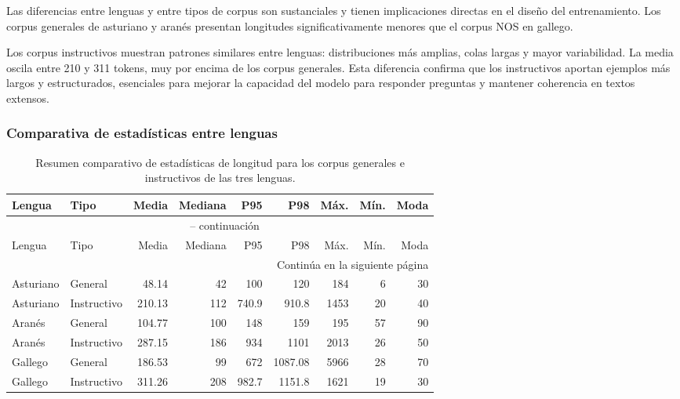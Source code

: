 Las diferencias entre lenguas y entre tipos de corpus son sustanciales y tienen implicaciones directas en el diseño del entrenamiento. Los corpus generales de asturiano y aranés presentan longitudes significativamente menores que el corpus NOS en gallego. 

Los corpus instructivos muestran patrones similares entre lenguas: distribuciones más amplias, colas largas y mayor variabilidad. La media oscila entre 210 y 311 tokens, muy por encima de los corpus generales. Esta diferencia confirma que los instructivos aportan ejemplos más largos y estructurados, esenciales para mejorar la capacidad del modelo para responder preguntas y mantener coherencia en textos extensos.

\subsubsection*{Comparativa de estadísticas entre lenguas}

\begin{longtable}{@{}llrrrrrrr@{}}
\caption{Resumen comparativo de estadísticas de longitud para los corpus generales e instructivos de las tres lenguas.}
\label{tab:estadisticas_globales} \\
\toprule
Lengua & Tipo & Media & Mediana & P95 & P98 & Máx. & Mín. & Moda \\ 
\midrule
\endfirsthead

\multicolumn{9}{c}{\tablename\ \thetable{} -- continuación} \\
\toprule
Lengua & Tipo & Media & Mediana & P95 & P98 & Máx. & Mín. & Moda \\ 
\midrule
\endhead

\midrule \multicolumn{9}{r}{Continúa en la siguiente página} \\
\endfoot

\bottomrule
\endlastfoot

Asturiano & General & 48.14 & 42 & 100 & 120 & 184 & 6 & 30 \\
Asturiano & Instructivo & 210.13 & 112 & 740.9 & 910.8 & 1453 & 20 & 40 \\

Aranés & General & 104.77 & 100 & 148 & 159 & 195 & 57 & 90 \\
Aranés & Instructivo & 287.15 & 186 & 934 & 1101 & 2013 & 26 & 50 \\

Gallego & General & 186.53 & 99 & 672 & 1087.08 & 5966 & 28 & 70 \\
Gallego & Instructivo & 311.26 & 208 & 982.7 & 1151.8 & 1621 & 19 & 30 \\

\end{longtable}

